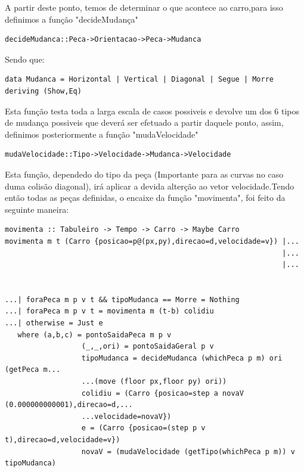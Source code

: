 \documentclass[a4paper]{report} %
\begin{document}
A partir deste ponto, temos de determinar o que acontece ao carro,para isso definimos a função "decideMudança"
\begin{verbatim}
decideMudanca::Peca->Orientacao->Peca->Mudanca
\end{verbatim}
Sendo que:
\begin{verbatim}
data Mudanca = Horizontal | Vertical | Diagonal | Segue | Morre deriving (Show,Eq)
\end{verbatim}
Esta função testa toda a larga escala de casos possiveis e devolve um dos 6 tipos de mudança possiveis que deverá ser efetuado a partir daquele ponto, assim, definimos posteriormente a função "mudaVelocidade"
\begin{verbatim}
mudaVelocidade::Tipo->Velocidade->Mudanca->Velocidade
\end{verbatim}
Esta função, dependedo do tipo da peça (Importante para as curvas no caso duma colisão diagonal), irá aplicar a devida alterção ao vetor velocidade.Tendo então todas as peças definidas, o encaixe da função "movimenta", foi feito da seguinte maneira:
\newpage
\begin{verbatim}
movimenta :: Tabuleiro -> Tempo -> Carro -> Maybe Carro
movimenta m t (Carro {posicao=p@(px,py),direcao=d,velocidade=v}) |...
                                                                 |...
                                                                 |...


...| foraPeca m p v t && tipoMudanca == Morre = Nothing
...| foraPeca m p v t = movimenta m (t-b) colidiu
...| otherwise = Just e
   where (a,b,c) = pontoSaidaPeca m p v
                  (_,_,ori) = pontoSaidaGeral p v
                  tipoMudanca = decideMudanca (whichPeca p m) ori (getPeca m... 
                  ...(move (floor px,floor py) ori))
                  colidiu = (Carro {posicao=step a novaV (0.000000000001),direcao=d,...
                  ...velocidade=novaV})             
                  e = (Carro {posicao=(step p v t),direcao=d,velocidade=v})
                  novaV = (mudaVelocidade (getTipo(whichPeca p m)) v tipoMudanca)
\end{verbatim}
\end{document}
